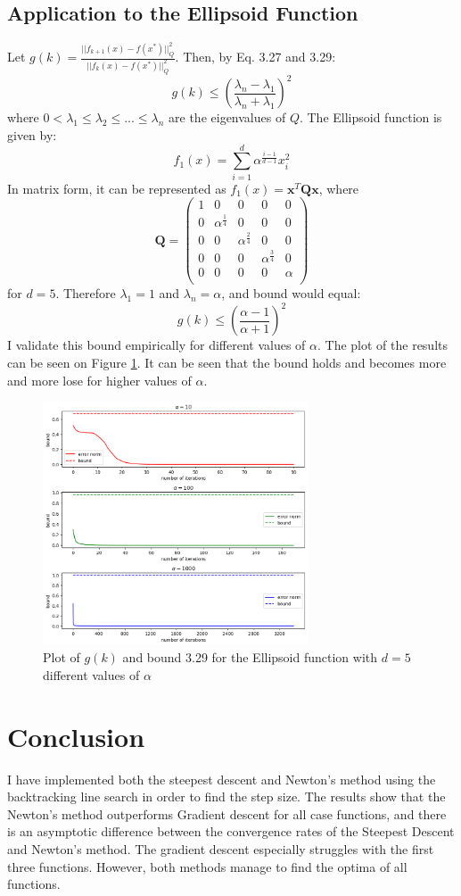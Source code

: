 \documentclass[a4paper]{article}
\begin{document}
\subsection{Application to the Ellipsoid Function}
Let $g(k) = \frac{||f_{k+1}(x) - f(x^*)||_Q^2} {||f_{k}(x) - f(x^*)||_Q^2}$. Then, by
Eq. 3.27 and 3.29:
\[
g(k) \leq \left(\frac{\lambda_n-\lambda_1}{\lambda_n + \lambda_1}\right)^2
\]
where $0<\lambda_1\leq \lambda_2 \leq ... \leq \lambda_n$ are the eigenvalues of
$Q$. The Ellipsoid function is given by: 
\[
f_{1}(x)=\sum_{i=1}^{d} \alpha^{\frac{i-1}{d-1}} x_{i}^{2}
\]
In matrix form, it can be represented as $f_1(x) =\mathbf{x}^T\mathbf{Qx}$, where
\[
\mathbf{Q} = 
\begin{pmatrix}
1 & 0 & 0 & 0 & 0 \\
0 & \alpha^{\frac{1}{4}} & 0 & 0 & 0 \\
0 & 0 & \alpha^{\frac{2}{4}} & 0 & 0  \\
0 & 0 & 0 & \alpha^{\frac{3}{4}} & 0  \\
0 & 0 & 0 & 0 & \alpha  \\
\end{pmatrix}
\]
for $d=5$. Therefore $\lambda_1 = 1$ and $\lambda_n = \alpha$, and bound would
equal:
\[
g(k) \leq \left(\frac{\alpha-1}{\alpha + 1}\right)^2
\]
I validate this bound empirically for different values of $\alpha$. The plot of
the results can be seen on Figure \ref{plt3}. It can be seen that the bound
holds and becomes more and more lose for higher values of $\alpha$.

\begin{figure}[]
    \centering
    \includegraphics[width=0.7\textwidth]{plt_bound.png}
    \caption{Plot of $g(k)$ and bound 3.29 for the Ellipsoid function with $d=5$ different values of $\alpha$}
  \label{plt3}
\end{figure}


\section{Conclusion}
I have implemented both the steepest descent and Newton's method using the
backtracking line search in order to find the step size. The results show that
the Newton's method outperforms Gradient descent for all case functions,
and there is an asymptotic difference between the convergence rates of the
Steepest Descent and Newton's method. The gradient descent especially struggles
with the first three functions. However, both methods manage to find the optima
of all functions.
\end{document}
